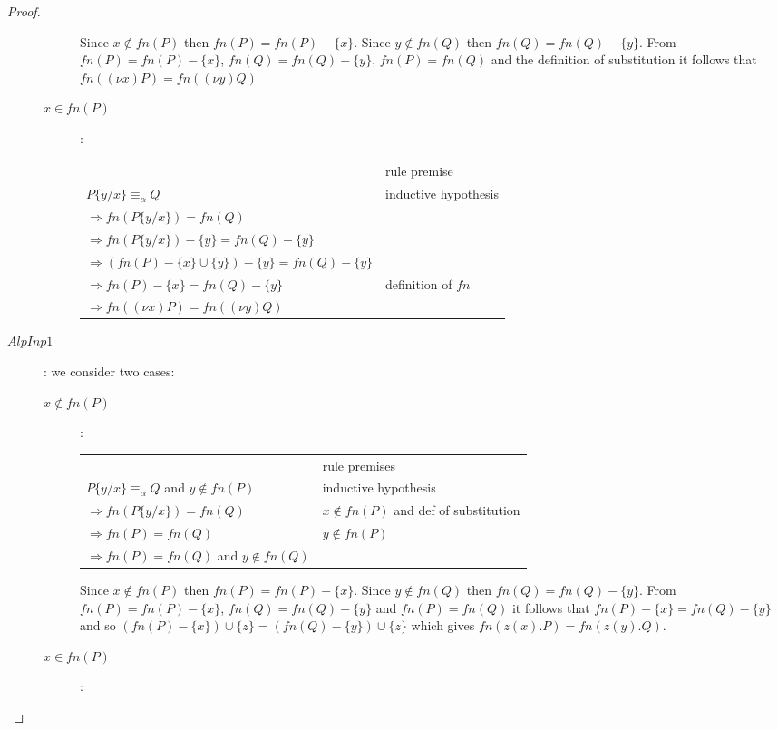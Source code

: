 \begin{lemma}
\begin{proof}
\begin{description}
\begin{description}
\begin{center}
	    \end{center}
	    Since $x\notin fn(P)$ then $fn(P)=fn(P)-\{x\}$. Since $y\notin fn(Q)$ then $fn(Q)=fn(Q)-\{y\}$. From $fn(P)=fn(P)-\{x\}$, $fn(Q)=fn(Q)-\{y\}$, $fn(P)=fn(Q)$ and the definition of substitution it follows that $fn((\nu x)P)=fn((\nu y)Q)$
	  \item[$x\in fn(P)$]:
	    \begin{center}
	      \begin{tabular}{ll}
		&rule premise\\
		$P\{y/x\}\equiv_{\alpha}Q$&inductive hypothesis\\
		$\Rightarrow fn(P\{y/x\})=fn(Q)$&\\
		$\Rightarrow fn(P\{y/x\})-\{y\}=fn(Q)-\{y\}$&\\
		$\Rightarrow (fn(P)-\{x\}\cup \{y\})-\{y\}=fn(Q)-\{y\}$&\\
		$\Rightarrow fn(P)-\{x\}=fn(Q)-\{y\}$&definition of $fn$\\
		$\Rightarrow fn((\nu x)P)=fn((\nu y)Q)$&\\
	      \end{tabular}
	    \end{center}
	\end{description}
      \item[$AlpInp1$]:
	we consider two cases:
	\begin{description}
	  \item[$x\notin fn(P)$]:
	    \begin{center}
	      \begin{tabular}{ll}
		&rule premises\\
		$P\{y/x\}\equiv_{\alpha}Q$ and $y\notin fn(P)$&inductive hypothesis\\
		$\Rightarrow fn(P\{y/x\})=fn(Q)$&$x\notin fn(P)$ and def of substitution\\
		$\Rightarrow fn(P)=fn(Q)$&$y\notin fn(P)$\\
		$\Rightarrow fn(P)=fn(Q)$ and $y\notin fn(Q)$&\\
	      \end{tabular}
	    \end{center}
	    Since $x\notin fn(P)$ then $fn(P)=fn(P)-\{x\}$. Since $y\notin fn(Q)$ then $fn(Q)=fn(Q)-\{y\}$. From $fn(P)=fn(P)-\{x\}$, $fn(Q)=fn(Q)-\{y\}$ and $fn(P)=fn(Q)$ it follows that $fn(P)-\{x\}=fn(Q)-\{y\}$ and so $(fn(P)-\{x\})\cup \{z\}=(fn(Q)-\{y\})\cup \{z\}$ which gives $fn(z(x).P)=fn(z(y).Q)$.
	  \item[$x\in fn(P)$]:
	    \begin{center}

\end{center}
\end{description}
\end{description}
\end{proof}
\end{lemma}
